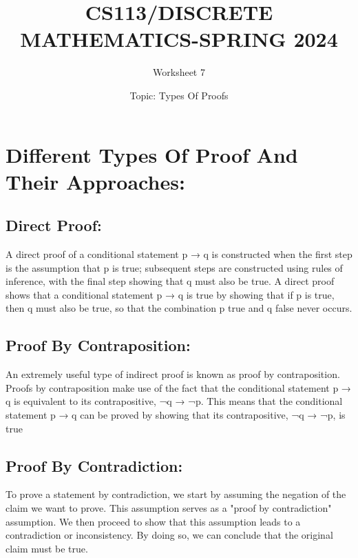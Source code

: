 \documentclass{exam}
\title{CS113/DISCRETE MATHEMATICS-SPRING 2024}
\author{Worksheet 7}
\date{Topic: Types Of Proofs}
\begin{document}
\maketitle

\begin{center}
\end{center}

\vspace{5mm}

\vspace{5mm}


\vspace{5mm}
\section{Different Types Of Proof And Their Approaches:}
\subsection{Direct Proof:}
A direct proof of a conditional statement p → q is constructed when the first step is the assumption that p is true; subsequent steps are constructed using rules of inference, with the final step showing that q must also be true. A direct proof shows that a conditional statement p → q is true by showing that if p is true, then q must also be true, so that the combination p true and q false never occurs. 
\subsection{Proof By Contraposition:}
An extremely useful type of indirect proof is known as proof by contraposition. Proofs
by contraposition make use of the fact that the conditional statement p → q is equivalent to its
contrapositive, ¬q → ¬p. This means that the conditional statement p → q can be proved by
showing that its contrapositive, ¬q → ¬p, is true
\subsection{Proof By Contradiction:}
To prove a statement by contradiction, we start by assuming the negation of the claim we want to prove. This assumption serves as a "proof by contradiction" assumption. We then proceed to show that this assumption leads to a contradiction or inconsistency. By doing so, we can conclude that the original claim must be true.
\end{document}
